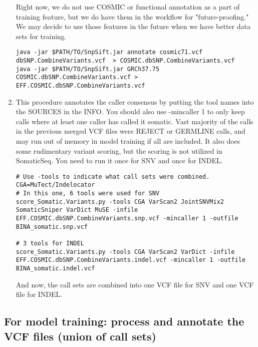 \documentclass[10pt,letterpaper]{article}
\begin{document}
\begin{sloppypar}
\begin{enumerate}
Right now, we do not use COSMIC or functional annotation as a part of training feature, but we do have them in the workflow for "future-proofing." We may decide to use those features in the future when we have better data sets for training. 
	
\begin{lstlisting}
java -jar $PATH/TO/SnpSift.jar annotate cosmic71.vcf dbSNP.CombineVariants.vcf  > COSMIC.dbSNP.CombineVariants.vcf
java -jar $PATH/TO/SnpSift.jar GRCh37.75 COSMIC.dbSNP.CombineVariants.vcf > EFF.COSMIC.dbSNP.CombineVariants.vcf
\end{lstlisting}
	
	
\item
This procedure annotates the caller consensus by putting the tool names into the SOURCES in the INFO. You should also use -mincaller 1 to only keep calls where at least one caller has called it somatic. Vast majority of the calls in the previous merged VCF files were REJECT or GERMLINE calls, and may run out of memory in model training if all are included. It also does some rudimentary variant scoring, but the scoring is not utilized in SomaticSeq. You need to run it once for SNV and once for INDEL. 
	
\begin{lstlisting}
# Use -tools to indicate what call sets were combined. CGA=MuTect/Indelocator
# In this one, 6 tools were used for SNV
score_Somatic.Variants.py -tools CGA VarScan2 JointSNVMix2 SomaticSniper VarDict MuSE -infile EFF.COSMIC.dbSNP.CombineVariants.snp.vcf -mincaller 1 -outfile BINA_somatic.snp.vcf
	
# 3 tools for INDEL
score_Somatic.Variants.py -tools CGA VarScan2 VarDict -infile EFF.COSMIC.dbSNP.CombineVariants.indel.vcf -mincaller 1 -outfile BINA_somatic.indel.vcf
\end{lstlisting}
	
And now, the call sets are combined into one VCF file for SNV and one VCF file for INDEL.


\end{enumerate}





\subsection{For model training: process and annotate the VCF files (union of call sets)}


\end{sloppypar}
\end{document}
